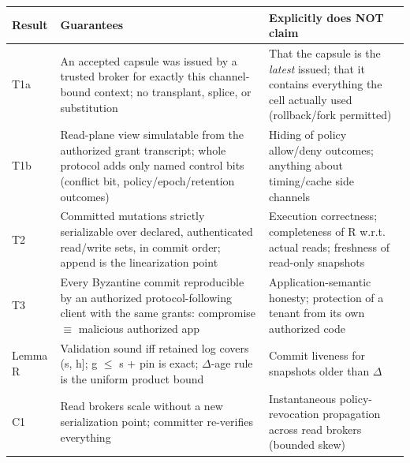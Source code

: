 \documentclass[
  11pt,
]{article}
\newcounter{none} %
\begin{document}
{\def\LTcaptype{none} %
\begin{longtable}[]{@{}
  >{\raggedright\arraybackslash}p{}
  >{\raggedright\arraybackslash}p{}
  >{\raggedright\arraybackslash}p{}@{}}
\toprule\noalign{}
\begin{minipage}[b]{\linewidth}\raggedright
Result
\end{minipage} & \begin{minipage}[b]{\linewidth}\raggedright
Guarantees
\end{minipage} & \begin{minipage}[b]{\linewidth}\raggedright
Explicitly does NOT claim
\end{minipage} \\
\midrule\noalign{}
\endhead
\bottomrule\noalign{}
\endlastfoot
T1a & An accepted capsule was issued by a trusted broker for exactly this channel-bound context; no transplant, splice, or substitution & That the capsule is the \emph{latest} issued; that it contains everything the cell actually used (rollback/fork permitted) \\
T1b & Read-plane view simulatable from the authorized grant transcript; whole protocol adds only named control bits (conflict bit, policy/epoch/retention outcomes) & Hiding of policy allow/deny outcomes; anything about timing/cache side channels \\
T2 & Committed mutations strictly serializable over declared, authenticated read/write sets, in commit order; append is the linearization point & Execution correctness; completeness of R w.r.t. actual reads; freshness of read-only snapshots \\
T3 & Every Byzantine commit reproducible by an authorized protocol-following client with the same grants: compromise $\equiv$ malicious authorized app & Application-semantic honesty; protection of a tenant from its own authorized code \\
Lemma R & Validation sound iff retained log covers (s, h{]}; g $\le$ s + pin is exact; $\Delta$-age rule is the uniform product bound & Commit liveness for snapshots older than $\Delta$ \\
C1 & Read brokers scale without a new serialization point; committer re-verifies everything & Instantaneous policy-revocation propagation across read brokers (bounded skew) \\
\end{longtable}
}
\end{document}
